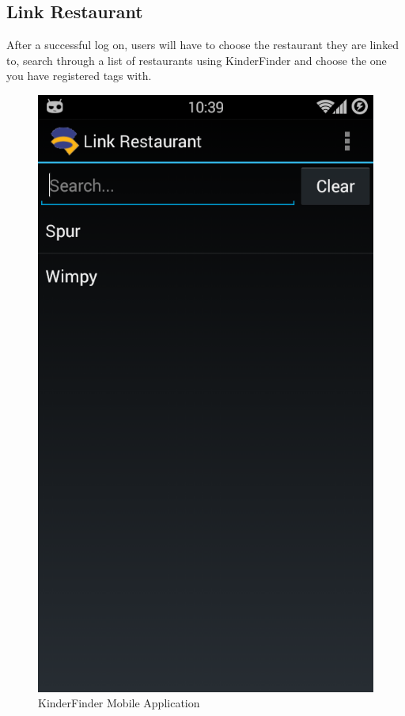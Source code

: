 \documentclass{article}
\begin{document}
\subsection{Link Restaurant}
After a successful log on, users will have to choose the restaurant they are linked to, search through a list of restaurants using KinderFinder and choose the one you have registered tags with.
\begin{figure}[H]
\centering
\includegraphics[scale=0.4]{Main App - Link Restaurant.png}
\caption{KinderFinder Mobile Application}
\end{figure}
\end{document}
